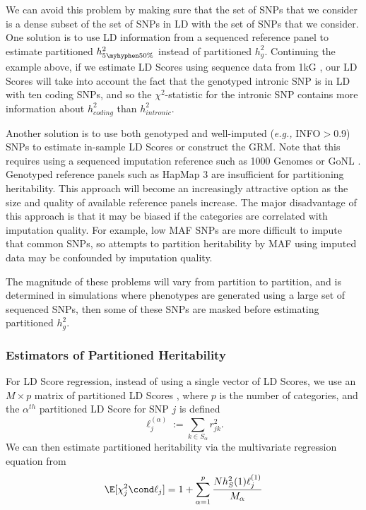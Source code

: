 We can avoid this problem by making sure that the set of SNPs that we consider is a dense subset of the set of SNPs in LD 
with the set of SNPs that we consider. 
One solution is to use LD information from a sequenced reference panel to estimate partitioned $h^2_{5\myhyphen50\%}$
\cite{buliksullivan2014, buliksullivan2014estimating, finucane2014partitioning} instead of partitioned $h^2_g$.
Continuing the example above, if we estimate LD Scores using sequence data from 1kG \cite{10002012integrated}, 
our LD Scores will take into account the fact that the
genotyped intronic SNP is in LD with ten coding SNPs, and so the $\chi^2$-statistic for the intronic SNP contains more
information about $h^2_{coding}$ than $h^2_{intronic}$.

Another solution is to use both genotyped and well-imputed (\emph{e.g.,} INFO$>$0.9)
SNPs to estimate in-sample LD Scores or construct the GRM.
Note that this requires using a sequenced imputation reference such as 1000 Genomes 
\cite{10002012integrated} or GoNL \cite{genome2014whole}.
Genotyped reference panels such as HapMap 3 \cite{international2010integrating}
are insufficient for partitioning heritability.
This approach will become an increasingly attractive option as the size and quality of available reference panels increase.
The major disadvantage of this approach is that it may be biased if the categories are correlated with imputation quality. 
For example, low MAF SNPs are more difficult to impute that common SNPs, so attempts to partition heritability by MAF 
using imputed data may be confounded by imputation quality.

The magnitude of these problems will vary from partition to partition, and is determined in simulations where phenotypes are generated using a large set of sequenced SNPs, then some of these SNPs are masked before estimating partitioned $h^2_g$.


\subsubsection{Estimators of Partitioned Heritability}

For LD Score regression, instead of using a single vector of LD Scores, we use an $M\times p$ matrix of partitioned
LD Scores \cite{finucane2014partitioning}, where $p$ is the number of categories, and the $\alpha^{th}$ partitioned LD Score
for SNP $j$ is defined
\begin{equation}
	\ell_j^{(\alpha)} := \sum_{k\in S_\alpha} r^2_{jk}.
\end{equation}
We can then estimate partitioned heritability via the multivariate regression equation from \cite{finucane2014partitioning}
\begin{equation}
	\E[\chi^2_j \cond \ell_j ] = 1 + \sum_{\alpha=1}^p \dfrac{Nh^2_S(1)\ell_j^{(1)}}{M_\alpha}  
\end{equation}


